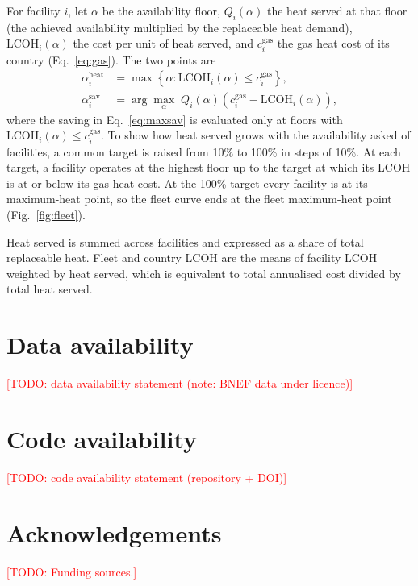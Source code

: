 \documentclass[11pt]{article}
\newcommand{\todo}[1]{\textcolor{red}{[TODO: #1]}}
\begin{document}
For facility $i$, let $\alpha$ be the availability floor, $Q_i(\alpha)$ the heat served at that floor (the achieved availability multiplied by the replaceable heat demand), $\mathrm{LCOH}_i(\alpha)$ the cost per unit of heat served, and $c^{\mathrm{gas}}_{i}$ the gas heat cost of its country (Eq.~\ref{eq:gas}). The two points are
\begin{align}
\alpha^{\mathrm{heat}}_i &= \max\left\{\alpha : \mathrm{LCOH}_i(\alpha) \leq c^{\mathrm{gas}}_{i}\right\}, \label{eq:maxheat}\\
\alpha^{\mathrm{sav}}_i &= \arg\max_{\alpha}\; Q_i(\alpha) \left(c^{\mathrm{gas}}_{i} - \mathrm{LCOH}_i(\alpha)\right), \label{eq:maxsav}
\end{align}
where the saving in Eq.~\ref{eq:maxsav} is evaluated only at floors with $\mathrm{LCOH}_i(\alpha) \leq c^{\mathrm{gas}}_{i}$. To show how heat served grows with the availability asked of facilities, a common target is raised from 10\% to 100\% in steps of 10\%. At each target, a facility operates at the highest floor up to the target at which its LCOH is at or below its gas heat cost. At the 100\% target every facility is at its maximum-heat point, so the fleet curve ends at the fleet maximum-heat point (Fig.~\ref{fig:fleet}).

Heat served is summed across facilities and expressed as a share of total replaceable heat. Fleet and country LCOH are the means of facility LCOH weighted by heat served, which is equivalent to total annualised cost divided by total heat served.

\section*{Data availability}
\todo{data availability statement (note: BNEF data under licence)}

\section*{Code availability}
\todo{code availability statement (repository + DOI)}




\section*{Acknowledgements}
\todo{Funding sources.}
\end{document}
